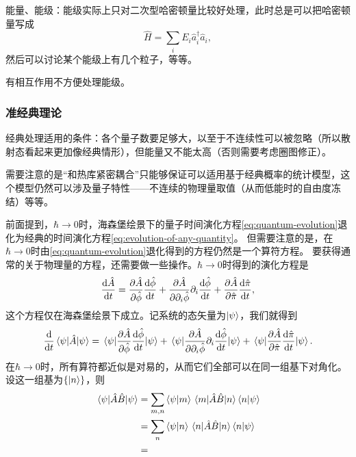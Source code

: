 \documentclass[UTF8, a4paper]{ctexart}
\begin{document}
能量、能级：能级实际上只对二次型哈密顿量比较好处理，此时总是可以把哈密顿量写成
\[
    \hat{H} = \sum_i E_i \hat{a}^\dagger_i \hat{a}_i,
\]
然后可以讨论某个能级上有几个粒子，等等。

有相互作用不方便处理能级。

\subsubsection{准经典理论}\label{sec:back-to-classical}

经典处理适用的条件：各个量子数要足够大，以至于不连续性可以被忽略（所以散射态看起来更加像经典情形），但能量又不能太高（否则需要考虑圈图修正）。

需要注意的是“和热库紧密耦合”只能够保证可以适用基于经典概率的统计模型，这个模型仍然可以涉及量子特性——不连续的物理量取值（从而低能时的自由度冻结）等等。

前面提到，$\hbar \to 0$时，海森堡绘景下的量子时间演化方程\eqref{eq:quantum-evolution}退化为经典的时间演化方程\eqref{eq:evolution-of-any-quantity}。
但需要注意的是，在$\hbar\to 0$时由\eqref{eq:quantum-evolution}退化得到的方程仍然是一个算符方程。
要获得通常的关于物理量的方程，还需要做一些操作。$\hbar\to 0$时得到的演化方程是
\[
    \dv{\hat{A}}{t} = \pdv{\hat{A}}{\hat{\phi}} \dv{\hat{\phi}}{t} + \pdv{\hat{A}}{\partial_i \hat{\phi}} \partial_i \dv{\hat{\phi}}{t} + \pdv{\hat{A}}{\hat{\pi}} \dv{\hat{\pi}}{t},
\]
这个方程仅在海森堡绘景下成立。记系统的态矢量为$\ket{\psi}$，我们就得到
\[
    \dv{t} \mel{\psi}{\hat{A}}{\psi} =  \mel{\psi}{\pdv{\hat{A}}{\hat{\phi}} \dv{\hat{\phi}}{t}}{\psi} + \mel{\psi}{\pdv{\hat{A}}{\partial_i \hat{\phi}} \partial_i \dv{\hat{\phi}}{t}}{\psi} + \mel{\psi}{\pdv{\hat{A}}{\hat{\pi}} \dv{\hat{\pi}}{t}}{\psi}.
\]
在$\hbar\to 0$时，所有算符都近似是对易的，从而它们全部可以在同一组基下对角化。设这一组基为$\{\ket{n}\}$，则
\[
    \begin{aligned}
        \mel{\psi}{\hat{A}\hat{B}}{\psi} &= \sum_{m,n} \braket{\psi}{m} \mel{m}{\hat{A}\hat{B}}{n} \braket{n}{\psi} \\
        &= \sum_{n} \braket{\psi}{n} \mel{n}{\hat{A}\hat{B}}{n} \braket{n}{\psi} \\
        &= 
    \end{aligned}
\]
\end{document}
